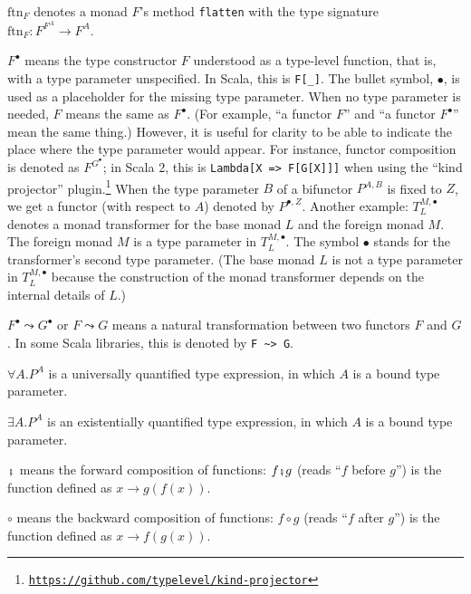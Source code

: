 $\text{ftn}_{F}$ denotes a monad $F$\textsf{'}s method \lstinline!flatten!
with the type signature $\text{ftn}_{F}:F^{F^{A}}\rightarrow F^{A}$.

$F^{\bullet}$ means the type constructor $F$ understood as a type-level
function, \textemdash{} that is, with a type parameter unspecified.
In Scala, this is \lstinline!F[_]!. The bullet symbol, $\bullet$,
is used as a placeholder for the missing type parameter. When no type
parameter is needed, $F$ means the same as $F^{\bullet}$. (For example,
\textsf{``}a functor $F$\textsf{''} and \textsf{``}a functor $F^{\bullet}$\textsf{''} mean the same
thing.) However, it is useful for clarity to be able to indicate the
place where the type parameter would appear. For instance, functor
composition is denoted as $F^{G^{\bullet}}$; in Scala 2, this is
\texttt{}\lstinline!Lambda[X => F[G[X]]]! when using the \textsf{``}kind
projector\textsf{''} plugin.\footnote{\texttt{\href{https://github.com/typelevel/kind-projector}{https://github.com/typelevel/kind-projector}}}
When the type parameter $B$ of a bifunctor $P^{A,B}$ is fixed to
$Z$, we get a functor (with respect to $A$) denoted by $P^{\bullet,Z}$.
Another example: $T_{L}^{M,\bullet}$ denotes a monad transformer
for the base monad $L$ and the foreign monad $M$. The foreign monad
$M$ is a type parameter in $T_{L}^{M,\bullet}$. The symbol $\bullet$
stands for the transformer\textsf{'}s second type parameter. (The base monad
$L$ is not a type parameter in $T_{L}^{M,\bullet}$ because the construction
of the monad transformer depends on the internal details of $L$.)

$F^{\bullet}\leadsto G^{\bullet}$ or $F\leadsto G$ means a natural
transformation between two functors $F$ and $G$. In some Scala libraries,
this is denoted by \lstinline!F ~> G!.

$\forall A.P^{A}$ is a universally quantified type expression, in
which $A$ is a bound type parameter.

$\exists A.P^{A}$ is an existentially quantified type expression,
in which $A$ is a bound type parameter.

$\bef$ means the forward composition
of functions: $f\bef g$ (reads \textsf{``}$f$ before $g$\textsf{''}) is the function
defined as $x\rightarrow g(f(x))$.

$\circ$ means the backward composition
of functions: $f\circ g$ (reads \textsf{``}$f$ after $g$\textsf{''}) is the function
defined as $x\rightarrow f(g(x))$.

